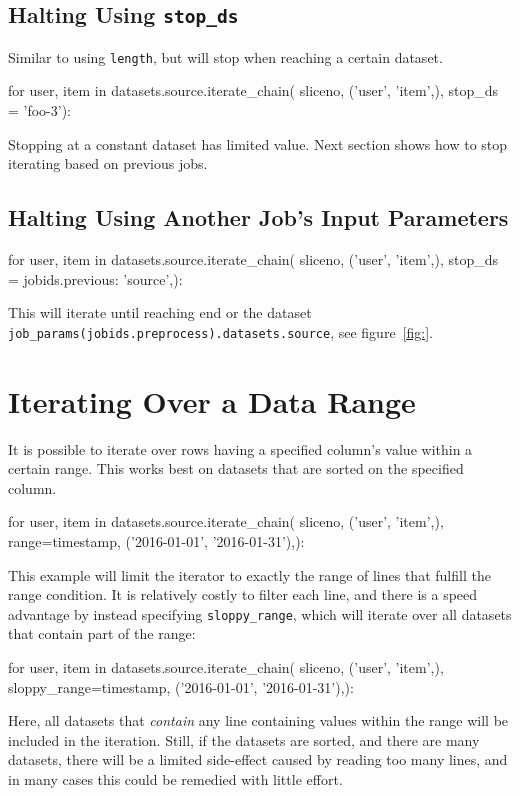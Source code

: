 \subsection*{Halting Using \texttt{stop\_ds}}
Similar to using \texttt{length}, but will stop when reaching a
certain dataset.
\begin{python}
for user, item in datasets.source.iterate_chain(
    sliceno, ('user', 'item',),
    stop_ds = 'foo-3'):
\end{python}
Stopping at a constant dataset has limited value.  Next section shows
how to stop iterating based on previous jobs.



\subsection*{Halting Using Another Job's Input Parameters}
\begin{python}
for user, item in datasets.source.iterate_chain(
    sliceno, ('user', 'item',),
    stop_ds = {jobids.previous: 'source',}):
\end{python}
This will iterate until reaching end or the dataset
\texttt{job\_params(jobids.preprocess).datasets.source}, see figure~\ref{fig:}.



\section{Iterating Over a Data Range}
\label{sec:iterate_sloppy_range}
It is possible to iterate over rows having a specified column's value
within a certain range.  This works best on datasets that are sorted
on the specified column.
\begin{python}
for user, item in datasets.source.iterate_chain(
    sliceno, ('user', 'item',),
    range={timestamp, ('2016-01-01', '2016-01-31'),}):
\end{python}
This example will limit the iterator to exactly the range of lines
that fulfill the range condition.  It is relatively costly to filter
each line, and there is a speed advantage by instead specifying
\texttt{sloppy\_range}, which will iterate over all datasets that
contain part of the range:
\begin{python}
for user, item in datasets.source.iterate_chain(
    sliceno, ('user', 'item',),
    sloppy_range={timestamp, ('2016-01-01', '2016-01-31'),}):
\end{python}
Here, all datasets that \textsl{contain} any line containing values
within the range will be included in the iteration.  Still, if the
datasets are sorted, and there are many datasets, there will be a
limited side-effect caused by reading too many lines, and in many
cases this could be remedied with little effort.



